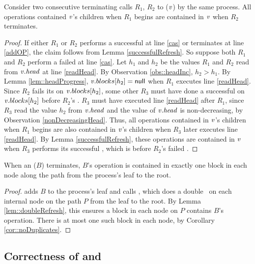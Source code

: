 \begin{lemma}\label{lem::doubleRefresh}
Consider two consecutive terminating calls $R_1$, $R_2$ to ($\mbox{\textnormal{\textit{v}}}$) by the same process.
All operations contained $\mbox{\textnormal{\textit{v}}}$'s children when $R_1$ begins
are contained in $\mbox{\textnormal{\textit{v}}}$ when $R_2$ terminates.
\end{lemma}
\begin{proof}
If either $R_1$ or $R_2$ performs a successful  at line \ref{cas} or terminates at line \ref{addOP}, the claim follows
from Lemma \ref{successfulRefresh}.
So suppose both $R_1$ and $R_2$ perform a failed  at line \ref{cas}.
Let $h_1$ and $h_2$ be the values $R_1$ and $R_2$ read from $\mbox{\textnormal{\textit{v}}}.\mbox{\textit{head}}$ at line \ref{readHead}.
By Observation \ref{obs::headInc}, $h_2>h_1$.
By Lemma \ref{lem::headProgress}, $\mbox{\textnormal{\textit{v}}}.blocks[h_2]=\mbox{\sf null}$ when $R_1$ executes line \ref{readHead}.
Since $R_2$ fails its  on $\mbox{\textnormal{\textit{v}}}.blocks[h_2]$, some other  $R_3$ must have done
a successful  on $\mbox{\textnormal{\textit{v}}}.blocks[h_2]$ before $R_2$'s .
$R_3$ must have executed line \ref{readHead} after $R_1$, since $R_3$ read the value $h_2$ from $\mbox{\textnormal{\textit{v}}}.\mbox{\textit{head}}$ and the value of $\mbox{\textnormal{\textit{v}}}.\mbox{\textit{head}}$ is non-decreasing, by Observation \ref{nonDecreasingHead}.
Thus, all operations contained in $\mbox{\textnormal{\textit{v}}}$'s children when $R_1$ begins
are also contained in $\mbox{\textnormal{\textit{v}}}$'s children when $R_3$ later executes line \ref{readHead}.
By Lemma \ref{successfulRefresh}, these operations are contained in $\mbox{\textnormal{\textit{v}}}$ when $R_3$ performs its successful ,
which is before $R_2$'s failed .
\end{proof}

\begin{lemma} \label{lem::appendExactlyOnce}
When an ($B$) terminates, $B$'s operation is contained in exactly one block in each node along the path from the process's leaf to the root.
\end{lemma}
\begin{proof}
 adds $B$ to the process's leaf and calls , which
does a double ~on each internal node on the path $P$ from the leaf to the root.
By Lemma \ref{lem::doubleRefresh}, this ensures a block in each node on $P$ contains $B$'s operation.
There is at most one such block in each node, by Corollary \ref{cor::noDuplicates}.
\end{proof}

\subsection{Correctness of  and }
\label{sec::tracingCorrect}

